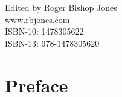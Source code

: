 \frontmatter

\newcommand\txo[3]{%
  \leavevmode
  \vbox{\offinterlineskip
    \halign{%
      \hfil##\hfil\cr %
      \strut#1\cr
      \noalign{\kern#3}
      \strut#2\cr
    }%
  }%
}
\newcommand\ucd{\txo{\kern.5em ̑}{ὑ}{-1em}}
\newcommand\icd{\txo{\kern.5em ̑}{ἰ}{-1em}}


\begin{titlepage}
\maketitle

\hspace{2in}

\vfill

\begin{centering}
  
\vfill

\vspace{0.1in}
Edited by Roger Bishop Jones\\
www.rbjones.com\\
\vspace{0.2in}
ISBN-10: 1478305622\\
ISBN-13: 978-1478305620\\
\vspace{0.2in}

{\footnotesize




}%

\end{centering}


\thispagestyle{empty}
\end{titlepage}

{\parskip=0pt\tableofcontents}

\vfill

\pagebreak

\chapter*{Preface}


